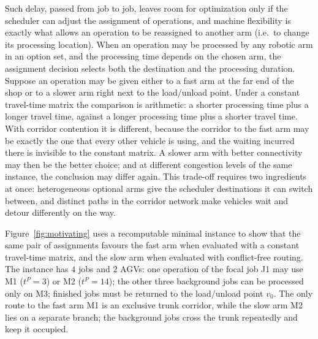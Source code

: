 Such delay, passed from job to job, leaves room for optimization only if the scheduler can adjust the assignment of operations, and machine flexibility is exactly what allows an operation to be reassigned to another arm (i.e.\ to change its processing location).
When an operation may be processed by any robotic arm in an option set, and the processing time depends on the chosen arm, the assignment decision selects both the destination and the processing duration.
Suppose an operation may be given either to a fast arm at the far end of the shop or to a slower arm right next to the load/unload point.
Under a constant travel-time matrix the comparison is arithmetic: a shorter processing time plus a longer travel time, against a longer processing time plus a shorter travel time.
With corridor contention it is different, because the corridor to the fast arm may be exactly the one that every other vehicle is using, and the waiting incurred there is invisible to the constant matrix.
A slower arm with better connectivity may then be the better choice; and at different congestion levels of the same instance, the conclusion may differ again.
This trade-off requires two ingredients at once: heterogeneous optional arms give the scheduler destinations it can switch between, and distinct paths in the corridor network make vehicles wait and detour differently on the way.

Figure~\ref{fig:motivating} uses a recomputable minimal instance to show that the same pair of assignments favours the fast arm when evaluated with a constant travel-time matrix, and the slow arm when evaluated with conflict-free routing.
The instance has $4$ jobs and $2$ AGVs: one operation of the focal job J1 may use M1 ($t^P=3$) or M2 ($t^P=14$); the other three background jobs can be processed only on M3; finished jobs must be returned to the load/unload point $v_0$.
The only route to the fast arm M1 is an exclusive trunk corridor, while the slow arm M2 lies on a separate branch; the background jobs cross the trunk repeatedly and keep it occupied.

